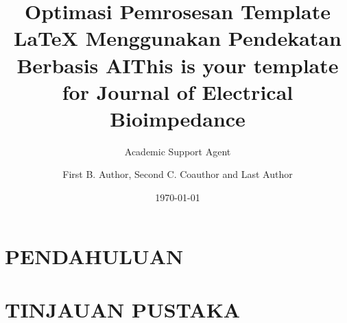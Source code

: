 \documentclass{elbioimp2}
\title{Optimasi Pemrosesan Template LaTeX Menggunakan Pendekatan Berbasis AI}
\author{Academic Support Agent}
\date{\today}
\begin{document}
\maketitle

\begin{abstract}

\end{abstract}

\chapter{PENDAHULUAN}


\chapter{TINJAUAN PUSTAKA}


\usepackage[utf8]{inputenc}

\usepackage[backend=biber,style=vancouver]{biblatex}
\usepackage{csquotes}
  
\title{This is your template for Journal of Electrical Bioimpedance}
\author{First B. Author, Second C. Coauthor and Last Author} 
 

\end{document}
